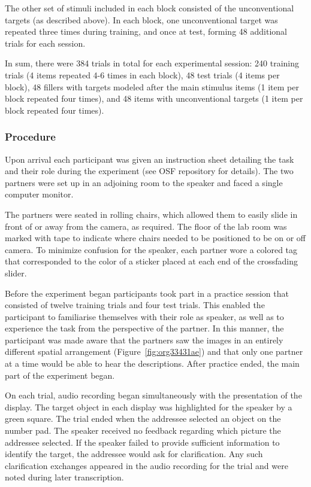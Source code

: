 \documentclass[natbib,doc,a4paper]{apa6}
\begin{document}
The other set of stimuli included in each block consisted of the unconventional targets (as described above). In each block, one unconventional target was repeated three times during training, and once at test, forming 48 additional trials for each session.

In sum, there were 384 trials in total for each experimental session: 240 training trials (4 items repeated 4-6 times in each block), 48 test trials (4 items per block), 48 fillers with targets modeled after the main stimulus items (1 item per block repeated four times), and 48 items with unconventional targets (1 item per block repeated four times).

\subsubsection*{Procedure}
\label{sec:orgdadee48}

Upon arrival each participant was given an instruction sheet detailing the task and their role during the experiment (see OSF repository for details). The two partners were set up in an adjoining room to the speaker and faced a single computer monitor. 

The partners were seated in rolling chairs, which allowed them to easily slide in front of or away from the camera, as required. The floor of the lab room was marked with tape to indicate where chairs needed to be positioned to be on or off camera. To minimize confusion for the speaker, each partner wore a colored tag that corresponded to the color of a sticker placed at each end of the crossfading slider. 

Before the experiment began participants took part in a practice session that consisted of twelve training trials and four test trials.  This enabled the participant to familiarise themselves with their role as speaker, as well as to experience the task from the perspective of the partner. In this manner, the participant was made aware that the partners saw the images in an entirely different spatial arrangement (Figure~\ref{fig:org33431ae}) and that only one partner at a time would be able to hear the descriptions. After practice ended, the main part of the experiment began.

On each trial, audio recording began simultaneously with the presentation of the display. The target object in each display was highlighted for the speaker by a green square. The trial ended when the addressee selected an object on the number pad. The speaker received no feedback regarding which picture the addressee selected. If the speaker failed to provide sufficient information to identify the target, the addressee would ask for clarification. Any such clarification exchanges appeared in the audio recording for the trial and were noted during later transcription.
\end{document}
